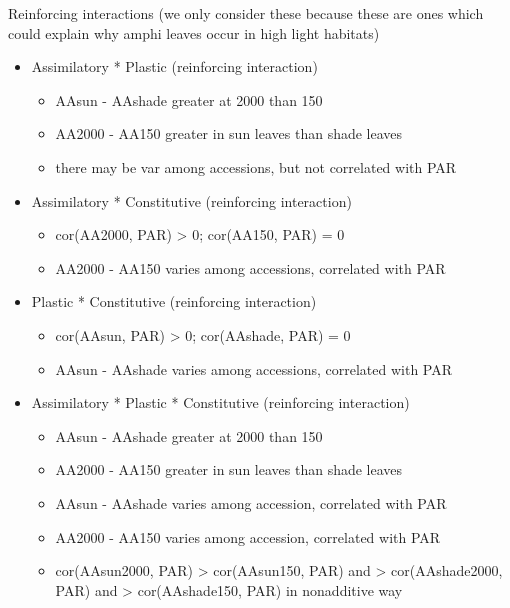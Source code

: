 \documentclass[
  letterpaper,
  DIV=11,
  numbers=noendperiod]{scrartcl}
\providecommand{\tightlist}{%
  \setlength{\itemsep}{0pt}\setlength{\parskip}{0pt}}\usepackage{longtable,booktabs,array}
\begin{document}
Reinforcing interactions (we only consider these because these are ones
which could explain why amphi leaves occur in high light habitats)

\begin{itemize}
\tightlist
\item
  Assimilatory * Plastic (reinforcing interaction)

  \begin{itemize}
  \tightlist
  \item
    AAsun - AAshade greater at 2000 than 150
  \item
    AA2000 - AA150 greater in sun leaves than shade leaves
  \item
    there may be var among accessions, but not correlated with PAR
  \end{itemize}
\item
  Assimilatory * Constitutive (reinforcing interaction)

  \begin{itemize}
  \tightlist
  \item
    cor(AA2000, PAR) \textgreater{} 0; cor(AA150, PAR) = 0
  \item
    AA2000 - AA150 varies among accessions, correlated with PAR
  \end{itemize}
\item
  Plastic * Constitutive (reinforcing interaction)

  \begin{itemize}
  \tightlist
  \item
    cor(AAsun, PAR) \textgreater{} 0; cor(AAshade, PAR) = 0
  \item
    AAsun - AAshade varies among accessions, correlated with PAR
  \end{itemize}
\item
  Assimilatory * Plastic * Constitutive (reinforcing interaction)

  \begin{itemize}
  \tightlist
  \item
    AAsun - AAshade greater at 2000 than 150
  \item
    AA2000 - AA150 greater in sun leaves than shade leaves
  \item
    AAsun - AAshade varies among accession, correlated with PAR
  \item
    AA2000 - AA150 varies among accession, correlated with PAR
  \item
    cor(AAsun2000, PAR) \textgreater{} cor(AAsun150, PAR) and
    \textgreater{} cor(AAshade2000, PAR) and \textgreater{}
    cor(AAshade150, PAR) in nonadditive way
  \end{itemize}
\end{itemize}
\end{document}
